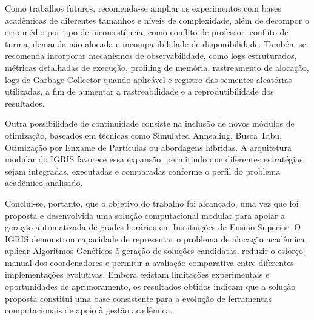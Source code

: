 Como trabalhos futuros, recomenda-se ampliar os experimentos com bases acadêmicas de diferentes tamanhos e níveis de complexidade, além de decompor o erro médio por tipo de inconsistência, como conflito de professor, conflito de turma, demanda não alocada e incompatibilidade de disponibilidade. Também se recomenda incorporar mecanismos de observabilidade, como logs estruturados, métricas detalhadas de execução, profiling de memória, rastreamento de alocação, logs de Garbage Collector quando aplicável e registro das sementes aleatórias utilizadas, a fim de aumentar a rastreabilidade e a reprodutibilidade dos resultados.

Outra possibilidade de continuidade consiste na inclusão de novos módulos de otimização, baseados em técnicas como Simulated Annealing, Busca Tabu, Otimização por Enxame de Partículas ou abordagens híbridas. A arquitetura modular do IGRIS favorece essa expansão, permitindo que diferentes estratégias sejam integradas, executadas e comparadas conforme o perfil do problema acadêmico analisado.

Conclui-se, portanto, que o objetivo do trabalho foi alcançado, uma vez que foi proposta e desenvolvida uma solução computacional modular para apoiar a geração automatizada de grades horárias em Instituições de Ensino Superior. O IGRIS demonstrou capacidade de representar o problema de alocação acadêmica, aplicar Algoritmos Genéticos à geração de soluções candidatas, reduzir o esforço manual dos coordenadores e permitir a avaliação comparativa entre diferentes implementações evolutivas. Embora existam limitações experimentais e oportunidades de aprimoramento, os resultados obtidos indicam que a solução proposta constitui uma base consistente para a evolução de ferramentas computacionais de apoio à gestão acadêmica.
